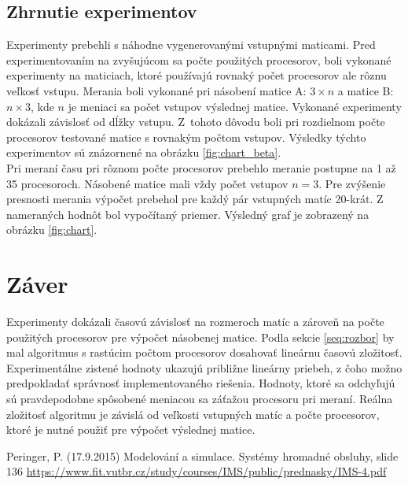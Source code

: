 \documentclass[a4paper, 14pt]{article}
\begin{document}
\subsection{Zhrnutie experimentov}
Experimenty prebehli s náhodne vygenerovanými vstupnými maticami. Pred experimentovaním na zvyšujúcom sa počte použitých procesorov, boli vykonané experimenty na maticiach, ktoré používajú rovnaký počet procesorov ale rôznu veľkosť vstupu. Merania boli vykonané pri násobení matice A: $3 \times n$ a matice B: $n \times 3$, kde $n$ je meniaci sa počet vstupov výslednej matice. Vykonané experimenty dokázali závislosť od dĺžky vstupu. Z~tohoto dôvodu boli pri rozdielnom počte procesorov testované matice s rovnakým počtom vstupov. Výsledky týchto experimentov sú znázornené na obrázku \ref{fig:chart_beta}.  \\
Pri meraní času pri rôznom počte procesorov prebehlo meranie postupne na 1 až 35 procesoroch. Násobené matice mali vždy počet vstupov $n=3$. Pre zvýšenie presnosti merania výpočet prebehol pre každý pár vstupných matíc 20\--krát. Z nameraných hodnôt bol vypočítaný priemer. Výsledný graf je zobrazený na obrázku \ref{fig:chart}.


\section{Záver}
Experimenty dokázali časovú závislosť na rozmeroch matíc a zároveň na počte použitých procesorov pre výpočet násobenej matice. Podla sekcie \ref{seq:rozbor} by mal algoritmus s rastúcim počtom procesorov dosahovať lineárnu časovú zložitosť.
Experimentálne zistené hodnoty ukazujú približne lineárny priebeh, z čoho možno predpokladať správnosť implementovaného riešenia. Hodnoty, ktoré sa odchyľujú sú pravdepodobne spôsobené meniacou sa záťažou procesoru pri meraní. Reálna zložitosť algoritmu je závislá od veľkosti vstupných matíc a počte procesorov, ktoré je nutné použiť pre výpočet výslednej matice.

\newpage
\begin{thebibliography}{9}
 	Peringer, P. (17.9.2015) Modelování a simulace. Systémy hromadné obsluhy, slide 136
	 \href{https://www.fit.vutbr.cz/study/courses/IMS/public/prednasky/IMS-4.pdf}{https://www.fit.vutbr.cz/study/courses/IMS/public/prednasky/IMS-4.pdf}
\end{thebibliography}


\end{document}
